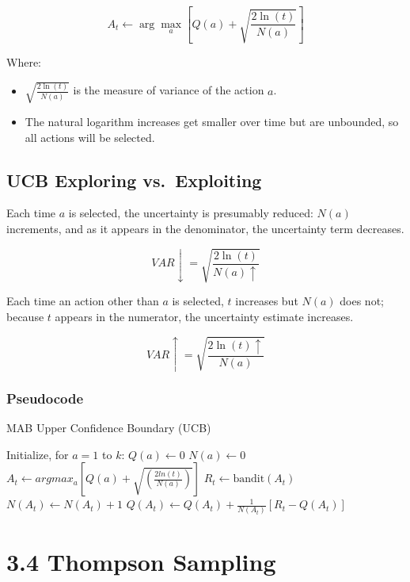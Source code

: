 \documentclass[
  letterpaper,
  DIV=11,
  numbers=noendperiod]{scrreprt}
\providecommand{\tightlist}{%
  \setlength{\itemsep}{0pt}\setlength{\parskip}{0pt}}\usepackage{longtable,booktabs,array}
\begin{document}
\[
A_t \gets \arg\max_a \left[ Q(a) + \sqrt{\frac{2 \ln(t)}{N(a)}} \right]
\]

Where:

\begin{itemize}
\tightlist
\item
  \(\sqrt{\frac{2 \ln(t)}{N(a)}}\) is the measure of variance of the
  action \(a\).
\item
  The natural logarithm increases get smaller over time but are
  unbounded, so all actions will be selected.
\end{itemize}

\section{UCB Exploring
vs.~Exploiting}\label{ucb-exploring-vs.-exploiting}

Each time \(a\) is selected, the uncertainty is presumably reduced:
\(N(a)\) increments, and as it appears in the denominator, the
uncertainty term decreases.

\[
VAR \downarrow = \sqrt{\frac{2 \ln(t)}{N(a)\uparrow}}
\]

Each time an action other than \(a\) is selected, \(t\) increases but
\(N(a)\) does not; because \(t\) appears in the numerator, the
uncertainty estimate increases.

\[
VAR \uparrow = \sqrt{\frac{2 \ln(t) \uparrow}{N(a)}}
\]

\subsection{Pseudocode}\label{pseudocode-1}

\begin{algorithm}[htb!]
\caption{MAB Upper Confidence Boundary (UCB)}
\begin{algorithmic}[1]
\State Initialize, for $a = 1$ to $k$:
\State $Q(a) \gets 0$ 
\State $N(a) \gets 0$ \\
    \State $A_t \gets argmax_a[Q(a) + \sqrt{(\frac{2 ln(t)}{N(a)})}]$
    \State $R_t \gets \text{bandit}(A_t)$
    \State $N(A_t) \gets N(A_t) + 1$
    \State $Q(A_t) \gets Q(A_t) + \frac{1}{N(A_t)}[R_t - Q(A_t)]$
\Endfor

\end{algorithmic}
\end{algorithm}

\chapter{3.4 Thompson Sampling}\label{thompson-sampling}
\end{document}
